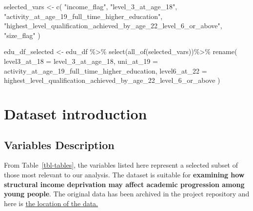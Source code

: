 \documentclass[11pt,en]{../resources/elegantpaper}
\newenvironment{Shaded}{\begin{snugshade}}{\end{snugshade}}
\newcommand{\AttributeTok}[1]{\textcolor[rgb]{0.77,0.63,0.00}{#1}}
\newcommand{\FunctionTok}[1]{\textcolor[rgb]{0.00,0.00,0.81}{#1}}
\newcommand{\NormalTok}[1]{#1}
\newcommand{\OtherTok}[1]{\textcolor[rgb]{0.50,0.00,0.50}{#1}}
\newcommand{\SpecialCharTok}[1]{\textcolor[rgb]{0.00,0.00,0.00}{#1}}
\newcommand{\StringTok}[1]{\textcolor[rgb]{0.31,0.60,0.02}{#1}}
\begin{document}
\begin{Shaded}
\begin{Highlighting}[]
\NormalTok{selected\_vars }\OtherTok{\textless{}{-}} \FunctionTok{c}\NormalTok{( }
  \StringTok{"income\_flag"}\NormalTok{,}
  \StringTok{"level\_3\_at\_age\_18"}\NormalTok{,}
  \StringTok{"activity\_at\_age\_19\_full\_time\_higher\_education"}\NormalTok{,}
  \StringTok{"highest\_level\_qualification\_achieved\_by\_age\_22\_level\_6\_or\_above"}\NormalTok{,}
  \StringTok{"size\_flag"}
\NormalTok{)}

\NormalTok{edu\_df\_selected }\OtherTok{\textless{}{-}}\NormalTok{ edu\_df }\SpecialCharTok{\%\textgreater{}\%}
  \FunctionTok{select}\NormalTok{(}\FunctionTok{all\_of}\NormalTok{(selected\_vars))}\SpecialCharTok{\%\textgreater{}\%}
  \FunctionTok{rename}\NormalTok{(}
    \AttributeTok{level3\_at\_18 =}\NormalTok{ level\_3\_at\_age\_18,}
    \AttributeTok{uni\_at\_19 =}\NormalTok{ activity\_at\_age\_19\_full\_time\_higher\_education,}
    \AttributeTok{level6\_at\_22 =}\NormalTok{ highest\_level\_qualification\_achieved\_by\_age\_22\_level\_6\_or\_above}
\NormalTok{  )}
\end{Highlighting}
\end{Shaded}

\section{Dataset introduction}\label{dataset-introduction}

\subsection{Variables Description}\label{variables-description}

From Table~\ref{tbl-tables}, the variables listed here represent a
selected subset of those most relevant to our analysis. The dataset is
suitable for \textbf{examining how structural income deprivation may
affect academic progression among young people}. The original data has
been archived in the project repository and here is
\href{data/english_education.csv}{the location of the data.}
\end{document}
